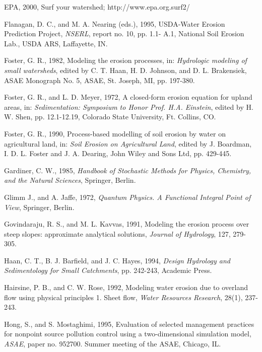 \documentclass{kapedbk} %
\begin{document}
\begin{chapthebibliography}{1}
{\bibitem{}
EPA, 2000, Surf your watershed; http://www.epa.org.surf2/

\bibitem{}
Flanagan, D. C., and M. A. Nearing (eds.), 1995,
USDA-Water Erosion Prediction Project, 
{\it NSERL}, report no. 10, pp. 1.1- A.1, National Soil Erosion Lab., 
USDA ARS, Laffayette, IN.

\bibitem{}
Foster, G. R., 1982, 
Modeling the erosion processes, in: {\it Hydrologic modeling of small watersheds},
edited by C. T. Haan, H. D. Johnson, and D. L. Brakensiek, ASAE Monograph No. 5,
ASAE, St. Joseph, MI, pp. 197-380.

\bibitem{}
Foster, G. R., and L. D. Meyer, 1972, A closed-form erosion equation 
for upland areas, in: {\it Sedimentation: Symposium to Honor Prof. H.A. Einstein}, 
edited by H. W. Shen, pp. 12.1-12.19, Colorado State University, Ft. Collins, CO.

\bibitem{}
Foster, G. R., 1990, Process-based modelling of soil erosion by water on 
agricultural land, in: {\it Soil Erosion on Agricultural Land}, 
edited by J. Boardman, I. D. L. Foster and J. A. Dearing, 
John Wiley and Sons Ltd, pp. 429-445.


\bibitem{}
Gardiner, C. W., 1985,  {\it Handbook of Stochastic Methods for Physics, 
Chemistry, and the Natural Sciences}, Springer, Berlin.

\bibitem{} 
Glimm J., and A. Jaffe, 1972, {\it Quantum Physics. A Functional Integral Point
 of View}, Springer, Berlin.

\bibitem{}
Govindaraju, R. S., and M. L. Kavvas, 1991, Modeling the erosion process 
over steep slopes: approximate analytical solutions, 
{\it Journal of Hydrology}, 127, 279-305.


\bibitem{}
Haan, C. T., B. J. Barfield, and J. C. Hayes, 1994,
{\it Design Hydrology and Sedimentology for Small Catchments}, 
pp. 242-243, Academic Press.

\bibitem{}
Hairsine,  P. B., and C. W. Rose, 1992,  Modeling water erosion due to overland 
flow using physical principles 1. Sheet flow, 
{\it Water Resources Research}, 28(1), 237-243.

\bibitem{}
Hong, S., and S. Mostaghimi, 1995, Evaluation of selected management practices 
for nonpoint source pollution control using a two-dimensional simulation model, 
{\it ASAE}, paper no. 952700. Summer meeting of the ASAE, Chicago, IL.

}
\end{chapthebibliography}
\end{document}

